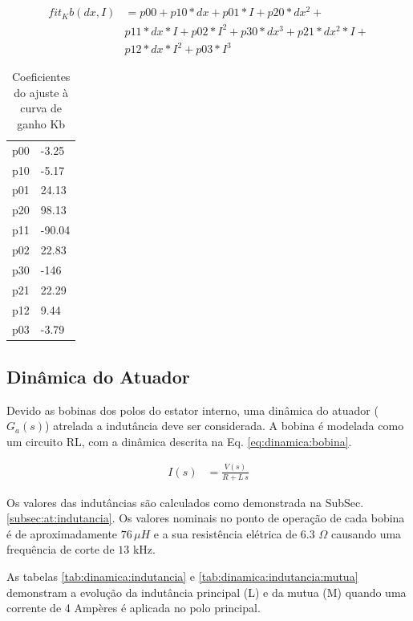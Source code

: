\begin{align}
     fit_Kb(dx,I) &= p00 + p10*dx + p01*I + p20*dx^2 +\\
     & p11*dx*I + p02*I^2 + p30*dx^3 + p21*dx^2*I +\\
     & p12*dx*I^2 + p03*I^3
     \label{eq:fb:segundo:grau}
\end{align}

\begin{table}[ht!]
\centering
\begin{tabular}{c l}
	   p00 & -3.25\\
	   p10 & -5.17\\
	   p01 &  24.13\\
	   p20 &   98.13\\
	   p11 & -90.04\\
	   p02 &  22.83\\
	   p30 &   -146\\
	   p21 &  22.29\\
	   p12 &  9.44	\\
	   p03 & -3.79
\end{tabular} 
\caption{Coeficientes do ajuste à curva de ganho Kb}
\label{tab:dinamico:ajuste:kb}
\end{table}

\subsection{Dinâmica do Atuador}

Devido as bobinas dos polos do estator interno, uma dinâmica do atuador ($G_a(s)$) atrelada a indutância deve ser considerada. A bobina é modelada como um circuito RL, com a dinâmica descrita na Eq. \eqref{eq:dinamica:bobina}.

\begin{align}
	I(s) &= \frac{V(s)}{R + L \, s} 
	\label{eq:dinamica:bobina}
\end{align}

Os valores das indutâncias são calculados como demonstrada na SubSec. \ref{subsec:at:indutancia}. Os valores nominais no ponto de operação de cada bobina é de aproximadamente $76 \, \mu H$ e a sua resistência elétrica de 6.3 $\Omega$ causando uma frequência de corte de $13$ kHz. 

As tabelas \ref{tab:dinamica:indutancia} e \ref{tab:dinamica:indutancia:mutua} demonstram a evolução da indutância principal (L) e da mutua (M) quando uma corrente de 4 Ampères é aplicada no polo principal. 

